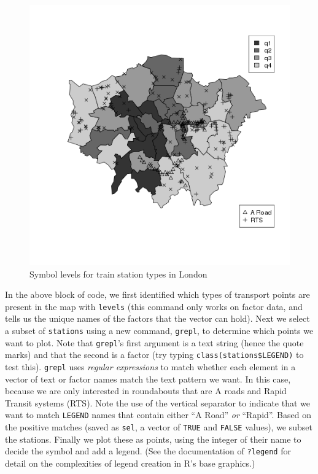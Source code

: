 \documentclass[]{article}
\begin{document}
\begin{figure}[htbp]
\centering
\includegraphics{figure/Symbol_levels_for_train_station_types_in_London.png}
\caption{Symbol levels for train station types in London}
\end{figure}

In the above block of code, we first identified which types of transport
points are present in the map with \texttt{levels} (this command only
works on factor data, and tells us the unique names of the factors that
the vector can hold). Next we select a subset of \texttt{stations} using
a new command, \texttt{grepl}, to determine which points we want to
plot. Note that \texttt{grepl}'s first argument is a text string (hence
the quote marks) and that the second is a factor (try typing
\texttt{class(stations\$LEGEND)} to test this). \texttt{grepl} uses
\emph{regular expressions} to match whether each element in a vector of
text or factor names match the text pattern we want. In this case,
because we are only interested in roundabouts that are A roads and Rapid
Transit systems (RTS). Note the use of the vertical separator
\texttt{\textbar{}} to indicate that we want to match \texttt{LEGEND}
names that contain either ``A Road'' \emph{or} ``Rapid''. Based on the
positive matches (saved as \texttt{sel}, a vector of \texttt{TRUE} and
\texttt{FALSE} values), we subset the stations. Finally we plot these as
points, using the integer of their name to decide the symbol and add a
legend. (See the documentation of \texttt{?legend} for detail on the
complexities of legend creation in R's base graphics.)
\end{document}
